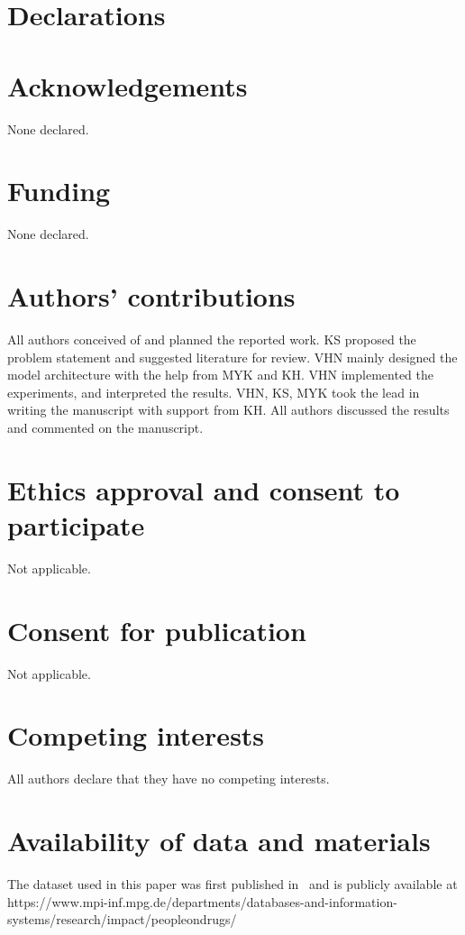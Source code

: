 \documentclass{bmcart}
\begin{document}
\section*{Declarations}
\begin{backmatter}

\section*{Acknowledgements}
None declared.

\section*{Funding}
None declared.

\section*{Authors’ contributions}
All authors conceived of and planned the reported work. KS proposed the problem statement and suggested literature for review. VHN mainly designed the model architecture with the help from MYK and KH. VHN implemented the experiments, and interpreted the results. VHN, KS, MYK took the lead in writing the manuscript with support from KH. All authors discussed the results and commented on the manuscript.

\section*{Ethics approval and consent to participate}
Not applicable.

\section*{Consent for publication}
Not applicable.

\section*{Competing interests}
  All authors declare that they have no competing interests.
  
\section*{Availability of data and materials}
The dataset used in this paper was first published in~\cite{mukherjee2014people} and is publicly available at https://www.mpi-inf.mpg.de/departments/databases-and-information-systems/research/impact/peopleondrugs/


\end{backmatter}
\end{document}
